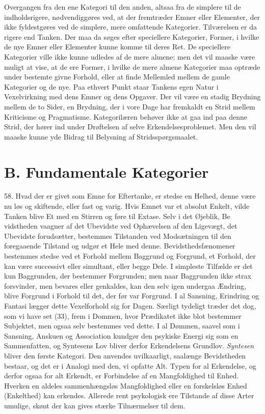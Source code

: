 \documentclass[12pt,a4paper]{book}
\newcommand{\opage}[1]{\marginnote{\footnotesize\textit{[#1]}}}
\begin{document}
Overgangen fra den ene Kategori til den anden, altsaa fra de simplere til de
indholdsrigere, nødvendiggøres ved, at der fremtræder Emner eller
Elementer, der ikke fyldestgøres ved de simplere, mere omfattende
Kategorier. Tilværelsen er da rigere end Tanken. Der maa da søges efter
speciellere Kategorier, Former, i hvilke de nye Emner eller Elementer kunne
komme til deres Ret. De speciellere Kategorier ville ikke kunne udledes af de
mere almene; men det vil maaske være muligt at vise, at de ere Former, i
hvilke de mere almene Kategorier maa optræde under bestemte givne Forhold,
eller at finde Mellemled mellem de gamle Kategorier og de nye. Paa ethvert
Punkt staar Tankens egen Natur i Vexelvirkning med dens Emner og dens
Opgaver. Der vil være en stadig Brydning mellem de to Sider, en Brydning,
der i vore Dage har fremkaldt en Strid mellem Kriticisme og Pragmatisme.
Kategorilæren behøver ikke at gaa ind paa denne Strid, der hører ind under
Drøftelsen af selve Erkendelsesproblemet. Men den vil maaske kunne yde
Bidrag til Belysning af Stridsspørgsmaalet.

\section*{B. Fundamentale Kategorier}
\label{sec:fundamentale-kategorier}

58. Hvad der er givet som Emne for Eftertanke, er stedse en Helhed, denne
være nu løs og skiftende, eller fast og varig. Hvis Emnet var et absolut
Enkelt, vilde Tanken blive Et med en Stirren og føre til Extase. Selv i det
Øjeblik, Be%
\opage{155}vidstheden vaagner af det Ubevidste ved Ophævelsen af den
Ligevægt, det Ubevidste forudsætter, bestemmes Tilstanden ved
Modsætningen til den foregaaende Tilstand og udgør et Hele med denne.
Bevidsthedsfænomener bestemmes stedse ved et Forhold mellem Baggrund og
Forgrund, et Forhold, der kan være successivt eller simultant, eller begge
Dele. I simpleste Tilfælde er det kun Baggrunden, der bestemmer
Forgrunden; men naar Baggrunden ikke strax forsvinder, men bevares eller
genkaldes, kan den selv igen undergaa Ændring, blive Forgrund i Forhold til
det, der før var Forgrund. I al Sansning, Erindring og Fantasi lægger dette
Vexelforhold sig for Dagen. Særligt tydeligt træder det dog, som vi have
set (33), frem i Dommen, hvor Prædikatet ikke blot bestemmer Subjektet, men
ogsaa selv bestemmes ved dette. I al Dømmen, saavel som i Sansning, Anskuen
og Association kundgør den psykiske Energi sig som en Sammenfatten, og
Syntesens Lov bliver derfor Erkendelsens Grundlov. \emph{Syntesen} bliver den
første Kategori. Den anvendes uvilkaarligt, saalænge Bevidstheden bestaar,
og det er i Analogi med den, vi opfatte Alt. Typen for al Erkendelse, og
derfor ogsaa for alt Erkendt, er Forbindelse af en Mangfoldighed til Enhed.
Hverken en aldeles sammenhængsløs Mangfoldighed eller en forskelsløs Enhed
(Enkelthed) kan erkendes. Allerede rent psykologisk ere Tilstande af disse
Arter umulige, skønt der kan gives stærke Tilnærmelser til dem.
\end{document}
